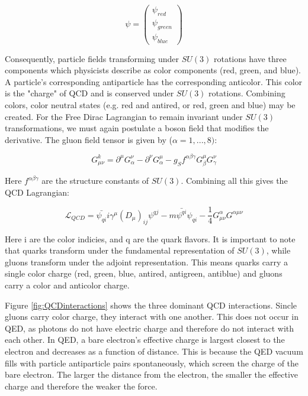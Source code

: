 \begin{equation}
\psi = \begin{pmatrix} \psi_{red} \\ \psi_{green} \\ \psi_{blue}\end{pmatrix}
\end{equation}

Consequently, particle fields transforming under $SU(3)$ rotations have three components which physicists describe as color components (red, green, and blue). A particle's corresponding antiparticle has the corresponding anticolor. This color is the "charge" of QCD and is conserved under $SU(3)$ rotations. Combining colors, color neutral states (e.g. red and antired, or red, green and blue) may be created.
For the Free Dirac Lagrangian to remain invariant under $SU(3)$ transformations, we must again postulate a boson field that modifies the derivative. The gluon field tensor is given by ($\alpha=1,...,8)$:

\begin{equation}
G_{\mu\nu}^{k}  = \partial^{\mu}G^{\nu}_{\alpha}-\partial^{\nu}G^{\mu}_{\alpha}-g_{S}f^{\alpha\beta\gamma}G^{\mu}_{\beta}G^{\nu}_{\gamma}
\end{equation}

Here $f^{\alpha\beta\gamma}$ are the structure constants of $SU(3)$. Combining all this gives the QCD Lagrangian:

\begin{equation}
\mathcal{L}_{QCD} = \bar{\psi_{qi}}i\gamma^{\mu} (D_{\mu})_{ij}\psi^{qj} - m\bar{\psi^{qi}}\psi_{qi} - \frac{1}{4}G^{\alpha}_{\mu\nu}G^{\alpha\mu\nu} 
\end{equation}

Here i are the color indicies, and q are the quark flavors. It is important to note that quarks transform under the fundamental representation of $SU(3)$, while gluons transform under the adjoint representation. This means quarks carry a single color charge (red, green, blue, antired, antigreen, antiblue) and gluons carry a color and anticolor charge. 

Figure \ref{fig:QCDinteractions} shows the three dominant QCD interactions. Sincle gluons carry color charge, they interact with one another. This does not occur in QED, as photons do not have electric charge and therefore do not interact with each other. In QED, a bare electron's effective charge is largest closest to the electron and decreases as a function of distance. This is because the QED vacuum fills with particle antiparticle pairs spontaneously, which screen the charge of the bare electron. The larger the distance from the electron, the smaller the effective charge and therefore the weaker the force. 

